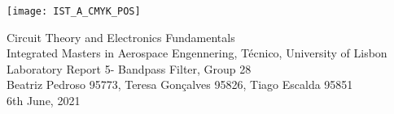 
\thispagestyle {empty}

\texttt{[image: IST\_A\_CMYK\_POS]}

\begin{center}
%
\vspace{1.0cm}

\vspace{1cm}
{\FontLb Circuit Theory and Electronics Fundamentals} \\ %
\vspace{1cm}
{\FontSn Integrated Masters in Aerospace Engennering, Técnico, University of Lisbon} \\ %
\vspace{1cm}
{\FontSn Laboratory Report 5- Bandpass Filter, Group 28} \\
\vspace{1cm}
{\FontSn Beatriz Pedroso 95773, Teresa Gonçalves 95826, Tiago Escalda 95851}\\
\vspace{1cm}
{\FontSn 6th June, 2021} \\ %
%
\end{center}

